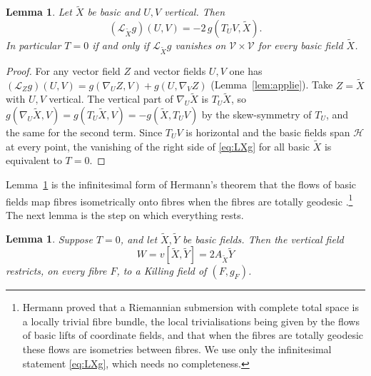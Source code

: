 \documentclass[11pt,reqno]{amsart}
\theoremstyle{plain}
\newtheorem{lemma}[theorem]{Lemma}
\theoremstyle{definition}
\newcommand{\hor}{\mathcal{H}}
\newcommand{\ver}{\mathcal{V}}
\newcommand{\lie}{\mathcal{L}}
\newcommand{\bas}[1]{\widetilde{#1}}
\begin{document}
\begin{lemma}\label{lem:flow}
Let $\bas X$ be basic and $U,V$ vertical. Then
\begin{equation}\label{eq:LXg}
(\lie_{\bas X}g)(U,V)=-2\,g(T_UV,\bas X).
\end{equation}
In particular $T=0$ if and only if $\lie_{\bas X}g$ vanishes on $\ver\times\ver$ for every basic field $\bas X$.
\end{lemma}

\begin{proof}
For any vector field $Z$ and vector fields $U,V$ one has $(\lie_Zg)(U,V)=g(\nabla_UZ,V)+g(U,\nabla_VZ)$ (Lemma~\ref{lem:applie}). Take $Z=\bas X$ with $U,V$ vertical. The vertical part of $\nabla_U\bas X$ is $T_U\bas X$, so $g(\nabla_U\bas X,V)=g(T_U\bas X,V)=-g(\bas X,T_UV)$ by the skew-symmetry of $T_U$, and the same for the second term. Since $T_UV$ is horizontal and the basic fields span $\hor$ at every point, the vanishing of the right side of \eqref{eq:LXg} for all basic $\bas X$ is equivalent to $T=0$.
\end{proof}

Lemma~\ref{lem:flow} is the infinitesimal form of Hermann's theorem that the flows of basic fields map fibres isometrically onto fibres when the fibres are totally geodesic \cite{Hermann1960}.\footnote{Hermann proved that a Riemannian submersion with complete total space is a locally trivial fibre bundle, the local trivialisations being given by the flows of basic lifts of coordinate fields, and that when the fibres are totally geodesic these flows are isometries between fibres. We use only the infinitesimal statement \eqref{eq:LXg}, which needs no completeness.} The next lemma is the step on which everything rests.

\begin{lemma}\label{lem:killing}
Suppose $T=0$, and let $\bas X,\bas Y$ be basic fields. Then the vertical field
\begin{equation}
W=v[\bas X,\bas Y]=2A_{\bas X}\bas Y
\end{equation}
restricts, on every fibre $F$, to a Killing field of $(F,g_F)$.
\end{lemma}
\end{document}
